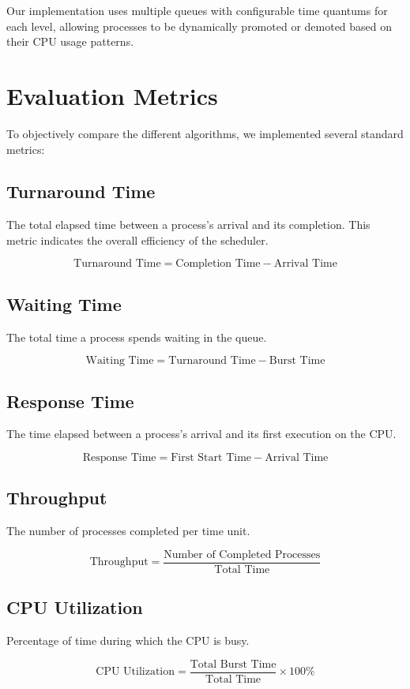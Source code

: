 \documentclass[12pt,a4paper]{article}
\begin{document}
Our implementation uses multiple queues with configurable time quantums for each level, allowing processes to be dynamically promoted or demoted based on their CPU usage patterns.

\section{Evaluation Metrics}
To objectively compare the different algorithms, we implemented several standard metrics:

\subsection{Turnaround Time}
The total elapsed time between a process's arrival and its completion. This metric indicates the overall efficiency of the scheduler.

\[ \text{Turnaround Time} = \text{Completion Time} - \text{Arrival Time} \]

\subsection{Waiting Time}
The total time a process spends waiting in the queue.

\[ \text{Waiting Time} = \text{Turnaround Time} - \text{Burst Time} \]

\subsection{Response Time}
The time elapsed between a process's arrival and its first execution on the CPU.

\[ \text{Response Time} = \text{First Start Time} - \text{Arrival Time} \]

\subsection{Throughput}
The number of processes completed per time unit.

\[ \text{Throughput} = \frac{\text{Number of Completed Processes}}{\text{Total Time}} \]

\subsection{CPU Utilization}
Percentage of time during which the CPU is busy.

\[ \text{CPU Utilization} = \frac{\text{Total Burst Time}}{\text{Total Time}} \times 100\% \]
\end{document}
